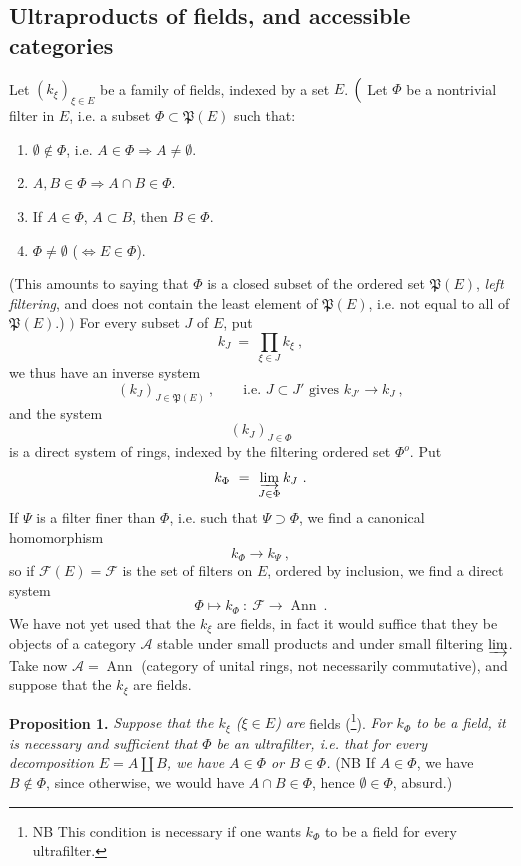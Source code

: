 \documentclass[11pt]{article}
\newcommand{\printedpage}[1]{\marginpar{\footnotesize p.~#1}}
\newcommand{\msp}[1]{\marginpar{\footnotesize [#1]}}
\newcommand{\cF}{\mathcal{F}}
\newcommand{\cA}{\mathcal{A}}
\newcommand{\Ann}{\operatorname{Ann}}
\begin{document}
\subsection*{Ultraproducts of fields, and accessible categories}

\noindent Let $(k_\xi)_{\xi\in E}$ be a family of fields, indexed by a set $E$. $\Bigl($ Let $\Phi$ be a nontrivial filter in $E$, i.e. a subset $\Phi\subset\mathfrak{P}(E)$ such that:
\begin{enumerate}
\item[a)] $\emptyset\notin\Phi$, i.e. $A\in\Phi\Longrightarrow A\neq\emptyset$.
\item[b)] $A,B\in\Phi\Longrightarrow A\cap B\in\Phi$.
\item[c)] If $A\in\Phi$, $A\subset B$, then $B\in\Phi$.
\item[d)] $\Phi\neq\emptyset$ ($\iff E\in\Phi$).
\end{enumerate}
(This amounts to saying that $\Phi$ is a closed subset of the ordered set $\mathfrak{P}(E)$, \textit{left filtering}, and does not contain the least element of $\mathfrak{P}(E)$, i.e. not equal to all of $\mathfrak{P}(E)$.) $\Bigr)$ For every subset $J$ of $E$, put
\[
k_J \ = \ \prod_{\xi\in J} k_\xi \ ,
\]
we thus have an inverse system
\[
(k_J)_{J\in\mathfrak{P}(E)} \ , \qquad \text{i.e. } J\subset J' \text{ gives } k_{J'}\longrightarrow k_J \ ,
\]
and the system
\[
(k_J)_{J\in\Phi}
\]
is a direct system of rings, indexed by the filtering ordered set $\Phi^o$. Put %
\[
k_\Phi \ = \ \varinjlim_{J\in\Phi} k_J \ .
\]
If $\Psi$ is a filter finer than $\Phi$, i.e.
\msp{page 2}
such that $\Psi\supset\Phi$, we find a canonical homomorphism
\[
k_\Phi \longrightarrow k_\Psi \ ,
\]
so if $\cF(E)=\cF$ is the set of filters on $E$, ordered by inclusion, we find a direct system
\[
\Phi \longmapsto k_\Phi \ : \ \cF \longrightarrow \Ann \ .
\]
We have not yet used that the $k_\xi$ are fields, in fact it would suffice that they be objects of a category $\cA$ stable under small products and under small filtering $\varinjlim$. Take now $\cA=\Ann$ (category of unital rings, not necessarily commutative), and suppose that the $k_\xi$ are fields. %

\printedpage{192}

\noindent\textbf{Proposition 1.} \textit{Suppose that the $k_\xi$ ($\xi\in E$) are} fields (\footnote[203]{NB This condition is necessary if one wants $k_\Phi$ to be a field for every ultrafilter.}). \textit{For $k_\Phi$ to be a field, it is necessary and sufficient that $\Phi$ be an ultrafilter, i.e. that for every decomposition $E=A\amalg B$, we have $A\in\Phi$ or $B\in\Phi$.} (NB If $A\in\Phi$, we have $B\notin\Phi$, since otherwise, we would have $A\cap B\in\Phi$, hence $\emptyset\in\Phi$, absurd.)
\end{document}
